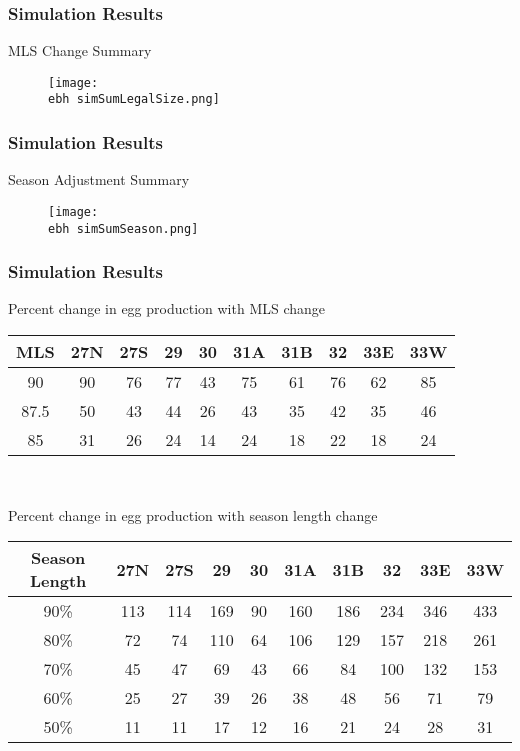 \documentclass{beamer}
\newcommand{\ebh}{\string~/bio.data/bio.lobster/figures/LFA2733Framework2018/} %
\begin{document}
\begin{frame}
\frametitle{Simulation Results}
MLS Change Summary 
\begin{figure}
        \begin{center}
            \texttt{[image: \\ebh simSumLegalSize.png]}
        \end{center}
    \end{figure}
\end{frame}




\begin{frame}
\frametitle{Simulation Results}
Season Adjustment Summary 
\begin{figure}
        \begin{center}
            \texttt{[image: \\ebh simSumSeason.png]}
        \end{center}
    \end{figure}
\end{frame}




\begin{frame}
\frametitle{Simulation Results}
Percent change in egg production with MLS change 
\centering
\begin{tabular}{|c|c|c|c|c|c|c|c|c|c|}
\hline
MLS & 27N & 27S & 29 & 30 & 31A & 31B & 32 & 33E & 33W \\
\hline
90 & 90 & 76 & 77 & 43 & 75 & 61 & 76 & 62 & 85 \\
\hline
87.5 & 50 & 43 & 44 & 26 & 43 & 35 & 42 & 35 & 46 \\
\hline
85 & 31 & 26 & 24 & 14 & 24 & 18 & 22 & 18 & 24 \\
\hline
 
\end{tabular}\\

\vspace{5mm}

Percent change in egg production with season length change 
\centering
\begin{tabular}{|c|c|c|c|c|c|c|c|c|c|}
\hline
Season Length & 27N & 27S & 29 & 30 & 31A & 31B & 32 & 33E & 33W \\
\hline
90\% & 113 & 114 & 169 & 90 & 160 & 186 & 234 & 346 & 433 \\
\hline
80\% & 72  & 74  & 110 & 64 & 106 & 129 & 157 & 218 & 261 \\
\hline
70\% & 45  & 47  & 69  & 43 & 66  & 84  & 100 & 132 & 153 \\
\hline
60\% & 25  & 27  & 39  & 26 & 38  & 48  & 56  & 71  & 79  \\
\hline
50\% & 11  & 11  & 17  & 12 & 16  & 21  & 24  & 28  & 31  \\
\hline
 
\end{tabular}
\end{frame}
\end{document}
